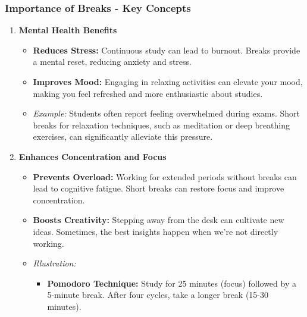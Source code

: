 \documentclass[aspectratio=169]{beamer}
\begin{document}
\begin{frame}[fragile]
    \frametitle{Importance of Breaks - Key Concepts}
    \begin{enumerate}
        \item \textbf{Mental Health Benefits}
        \begin{itemize}
            \item \textbf{Reduces Stress:} Continuous study can lead to burnout. Breaks provide a mental reset, reducing anxiety and stress.
            \item \textbf{Improves Mood:} Engaging in relaxing activities can elevate your mood, making you feel refreshed and more enthusiastic about studies.
            \item \textit{Example:} Students often report feeling overwhelmed during exams. Short breaks for relaxation techniques, such as meditation or deep breathing exercises, can significantly alleviate this pressure.
        \end{itemize}
        
        \item \textbf{Enhances Concentration and Focus}
        \begin{itemize}
            \item \textbf{Prevents Overload:} Working for extended periods without breaks can lead to cognitive fatigue. Short breaks can restore focus and improve concentration.
            \item \textbf{Boosts Creativity:} Stepping away from the desk can cultivate new ideas. Sometimes, the best insights happen when we’re not directly working.
            \item \textit{Illustration:} 
            \begin{itemize}
                \item \textbf{Pomodoro Technique:} Study for 25 minutes (focus) followed by a 5-minute break. After four cycles, take a longer break (15-30 minutes).
            \end{itemize}
        \end{itemize}
    \end{enumerate}
\end{frame}
\end{document}
